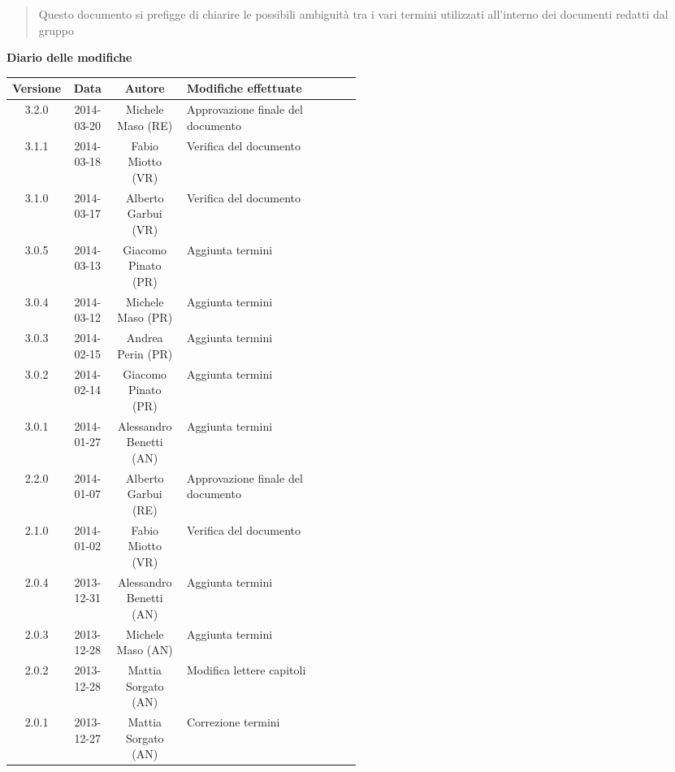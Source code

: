 \begin{abstract}
\begin{center}
Questo documento si prefigge di chiarire le possibili ambiguità tra i vari termini utilizzati all'interno dei documenti redatti dal gruppo \NomeGruppo{}
\end{center}
\end{abstract}

\newpage
\textbf{Diario delle modifiche}
\begin{center}
\begin{longtable}{|c|c|c|p{0.5\linewidth}|}
\toprule
\textbf{Versione} & \textbf{Data} & \textbf{Autore} & \textbf{Modifiche effettuate}\\

\midrule
3.2.0 & 2014-03-20 & Michele Maso (RE) & Approvazione finale del documento\\
\midrule
3.1.1 & 2014-03-18 & Fabio Miotto (VR) & Verifica del documento \\
\midrule
3.1.0 & 2014-03-17 & Alberto Garbui (VR) & Verifica del documento \\
\midrule
3.0.5 & 2014-03-13 & Giacomo Pinato (PR) & Aggiunta termini\\
\midrule
3.0.4 & 2014-03-12 & Michele Maso (PR) & Aggiunta termini\\
\midrule
3.0.3 & 2014-02-15 & Andrea Perin (PR) & Aggiunta termini\\
\midrule
3.0.2 & 2014-02-14 & Giacomo Pinato (PR) & Aggiunta termini\\
\midrule
3.0.1 & 2014-01-27 & Alessandro Benetti (AN) & Aggiunta termini\\

\midrule
2.2.0 & 2014-01-07 & Alberto Garbui (RE) & Approvazione finale del documento\\
\midrule
2.1.0 & 2014-01-02 & Fabio Miotto (VR) & Verifica del documento \\
\midrule
2.0.4 & 2013-12-31 & Alessandro Benetti (AN) & Aggiunta termini\\
\midrule
2.0.3 & 2013-12-28 & Michele Maso (AN) & Aggiunta termini\\
\midrule
2.0.2 & 2013-12-28 & Mattia Sorgato (AN) & Modifica lettere capitoli\\
\midrule
2.0.1 & 2013-12-27 & Mattia Sorgato (AN) & Correzione termini\\


\end{longtable}
\end{center}
